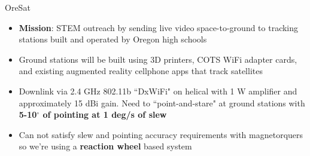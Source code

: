 \documentclass[slidestop,compress]{beamer}
\begin{document}
\begin{frame}[plain]
\begin{block}{\centering OreSat}
\hspace{1 mm}
\begin{itemize}
\item {\bf Mission}: STEM outreach by sending live video space-to-ground to tracking stations built and operated by Oregon high schools
\item Ground stations will be built using 3D printers, COTS WiFi adapter cards, and existing augmented reality cellphone apps that track satellites
\item Downlink via 2.4 GHz  802.11b ``DxWiFi" on helical with 1 W amplifier and approximately 15 dBi gain. Need to ``point-and-stare" at ground stations with {\bf 5-10$^{\circ}$ of pointing at 1 deg/s of slew}
\item Can not satisfy slew and pointing accuracy requirements with magnetorquers so we're using a {\bf{reaction wheel}} based system

\end{itemize}
\end{block}    
\end{frame}
\end{document}
